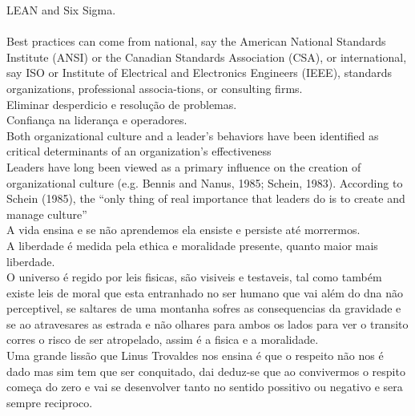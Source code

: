 LEAN and Six Sigma.\\
\\
Best practices can come from national, say the American National Standards Institute (ANSI) or the Canadian Standards Association (CSA), or international, say ISO or Institute of Electrical and Electronics Engineers (IEEE), standards organizations, professional associa-tions, or consulting firms.\\

Eliminar desperdicio e resolução de problemas.\\

Confiança na liderança e operadores.\\
Both organizational culture and a leader’s behaviors have been identified as critical determinants of an organization’s effectiveness\\
Leaders have long been viewed as a primary influence on the creation of organizational culture (e.g. Bennis and Nanus, 1985; Schein, 1983). According to Schein (1985), the “only thing of real importance that leaders do is to create and manage culture”\\


A vida ensina e se não aprendemos ela ensiste e persiste até morrermos.\\

A liberdade é medida pela ethica e moralidade presente, quanto maior mais liberdade.\\


O universo é regido por leis fisicas, são visiveis e testaveis, tal como também existe leis de moral que esta entranhado no ser humano que vai além do dna não perceptivel, se saltares de uma montanha sofres as consequencias da gravidade e se ao atravesares as estrada e não olhares para ambos os lados para ver o transito corres o risco de ser atropelado, assim é a fisica e a moralidade.\\

Uma grande lissão que Linus Trovaldes nos ensina é que o respeito não nos é dado mas sim tem que ser conquitado, dai deduz-se que ao convivermos o respito começa do zero e vai se desenvolver tanto no sentido possitivo ou negativo e sera sempre reciproco.\\

